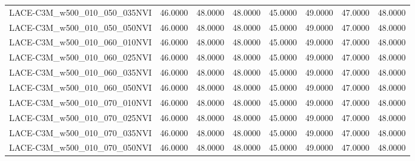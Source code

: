 \begin{table}
\begin{tabular}{lrrrrrrr}
LACE-C3M\_w500\_010\_050\_035NVI & 46.0000 & 48.0000 & 48.0000 & 45.0000 & 49.0000 & 47.0000 & 48.0000 \\
LACE-C3M\_w500\_010\_050\_050NVI & 46.0000 & 48.0000 & 48.0000 & 45.0000 & 49.0000 & 47.0000 & 48.0000 \\
LACE-C3M\_w500\_010\_060\_010NVI & 46.0000 & 48.0000 & 48.0000 & 45.0000 & 49.0000 & 47.0000 & 48.0000 \\
LACE-C3M\_w500\_010\_060\_025NVI & 46.0000 & 48.0000 & 48.0000 & 45.0000 & 49.0000 & 47.0000 & 48.0000 \\
LACE-C3M\_w500\_010\_060\_035NVI & 46.0000 & 48.0000 & 48.0000 & 45.0000 & 49.0000 & 47.0000 & 48.0000 \\
LACE-C3M\_w500\_010\_060\_050NVI & 46.0000 & 48.0000 & 48.0000 & 45.0000 & 49.0000 & 47.0000 & 48.0000 \\
LACE-C3M\_w500\_010\_070\_010NVI & 46.0000 & 48.0000 & 48.0000 & 45.0000 & 49.0000 & 47.0000 & 48.0000 \\
LACE-C3M\_w500\_010\_070\_025NVI & 46.0000 & 48.0000 & 48.0000 & 45.0000 & 49.0000 & 47.0000 & 48.0000 \\
LACE-C3M\_w500\_010\_070\_035NVI & 46.0000 & 48.0000 & 48.0000 & 45.0000 & 49.0000 & 47.0000 & 48.0000 \\
LACE-C3M\_w500\_010\_070\_050NVI & 46.0000 & 48.0000 & 48.0000 & 45.0000 & 49.0000 & 47.0000 & 48.0000 \\
\bottomrule
\end{tabular}
\end{table}
